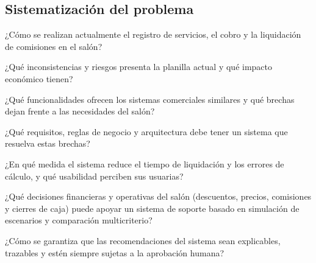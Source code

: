 \subsection{Sistematización del problema}

\begin{vinetas}
\item ¿Cómo se realizan actualmente el registro de servicios, el cobro y la liquidación de comisiones en el salón?
\item ¿Qué inconsistencias y riesgos presenta la planilla actual y qué impacto económico tienen?
\item ¿Qué funcionalidades ofrecen los sistemas comerciales similares y qué brechas dejan frente a las necesidades del salón?
\item ¿Qué requisitos, reglas de negocio y arquitectura debe tener un sistema que resuelva estas brechas?
\item ¿En qué medida el sistema reduce el tiempo de liquidación y los errores de cálculo, y qué usabilidad perciben sus usuarias?
\item ¿Qué decisiones financieras y operativas del salón (descuentos, precios, comisiones y cierres de caja) puede apoyar un sistema de soporte basado en simulación de escenarios y comparación multicriterio?
\item ¿Cómo se garantiza que las recomendaciones del sistema sean explicables, trazables y estén siempre sujetas a la aprobación humana?
\end{vinetas}
